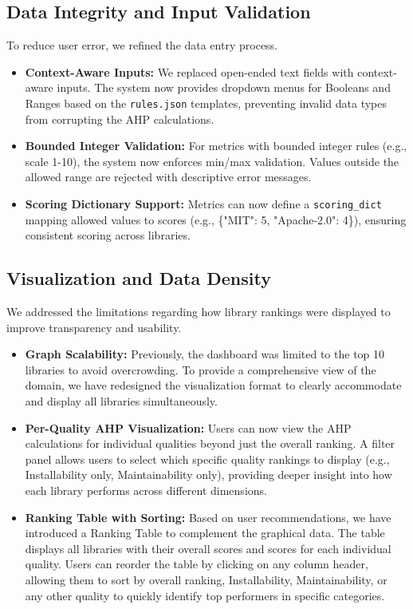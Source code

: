 \documentclass[12pt, titlepage]{article}
\begin{document}
\subsection{Data Integrity and Input Validation}
To reduce user error, we refined the data entry process.

\begin{itemize}
  \item \textbf{Context-Aware Inputs:} We replaced open-ended text fields with context-aware inputs. The system now provides dropdown menus for Booleans and Ranges based on the \texttt{rules.json} templates, preventing invalid data types from corrupting the AHP calculations.

  \item \textbf{Bounded Integer Validation:} For metrics with bounded integer rules (e.g., scale 1-10), the system now enforces min/max validation. Values outside the allowed range are rejected with descriptive error messages.

  \item \textbf{Scoring Dictionary Support:} Metrics can now define a \texttt{scoring\_dict} mapping allowed values to scores (e.g., \{"MIT": 5, "Apache-2.0": 4\}), ensuring consistent scoring across libraries.
\end{itemize}

\subsection{Visualization and Data Density}
We addressed the limitations regarding how library rankings were displayed to improve transparency and usability.

\begin{itemize}
  \item \textbf{Graph Scalability:} Previously, the dashboard was limited to the top 10 libraries to avoid overcrowding. To provide a comprehensive view of the domain, we have redesigned the visualization format to clearly accommodate and display all libraries simultaneously.

  \item \textbf{Per-Quality AHP Visualization:} Users can now view the AHP calculations for individual qualities beyond just the overall ranking. A filter panel allows users to select which specific quality rankings to display (e.g., Installability only, Maintainability only), providing deeper insight into how each library performs across different dimensions.

  \item \textbf{Ranking Table with Sorting:} Based on user recommendations, we have introduced a Ranking Table to complement the graphical data. The table displays all libraries with their overall scores and scores for each individual quality. Users can reorder the table by clicking on any column header, allowing them to sort by overall ranking, Installability, Maintainability, or any other quality to quickly identify top performers in specific categories.
\end{itemize}
\end{document}
